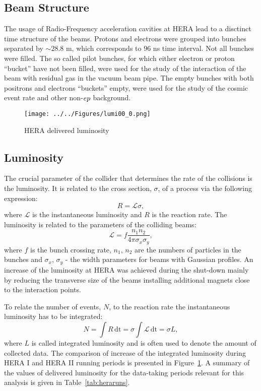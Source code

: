 \subsection{Beam Structure}
\label{subsec:beamstruct}
The usage of Radio-Frequency acceleration cavities at HERA lead to a disctinct time structure of the beams. Protons and electrons were grouped into bunches separated by $\sim 28.8$ m, which corresponds to $96$ ns time interval. Not all bunches were filled. The so called pilot bunches, for which either electron or proton ``bucket'' have not been filled, were used for the study of the interaction of the beam with residual gas in the vacuum beam pipe. The empty bunches with both positrons and electrons ``buckets'' empty, were used for the study of the cosmic event rate and other non-$\mbox{$e p$}$ background.

\begin{figure}[t]
	\centering
		\texttt{[image: ../../Figures/lumi00\_0.png]}
	\caption{HERA delivered luminosity}
	\label{fig:lumi00_0}
\end{figure}

\subsection{Luminosity}
\label{subsec:luminosity}
The crucial parameter of the collider that determines the rate of the collisions is the luminosity. It is related to the cross section, $\sigma$, of a process via the following expression:
\begin{equation}
	R = \mathcal{L}\sigma,
\end{equation}
where $\mathcal{L}$ is the instantaneous luminosity and $R$ is the reaction rate. The luminosity is related to the parameters of the colliding beams:
\begin{equation}
	\mathcal{L} = f\frac{n_1n_2}{4\pi\sigma_x\sigma_y},
\end{equation}
where $f$ is the bunch crossing rate, $n_1,\,n_2$ are the numbers of particles in the bunches and $\sigma_x$, $\sigma_y$ - the width parameters for beams with Gaussian profiles. An increase of the luminosity at HERA was achieved during the shut-down mainly by reducing the transverse size of the beams installing additional magnets close to the interaction points. 

To relate the number of events, $N$, to the reaction rate the instantaneous luminosity has to be integrated:
\begin{equation}
	N = \int{R\,\mathrm{dt}} = \sigma\int{\mathcal{L}\,\mathrm{dt}} = \sigma L,
\end{equation}
where $L$ is called integrated luminosity and is often used to denote the amount of collected data. The comparison of increase of the integrated luminosity during HERA I and HERA II running periods is presented in Figure~\ref{fig:lumi00_0}. A summary of the values of delivered luminosity for the data-taking periods relevant for this analysis is given in Table~\ref{tab:heraruns}.

